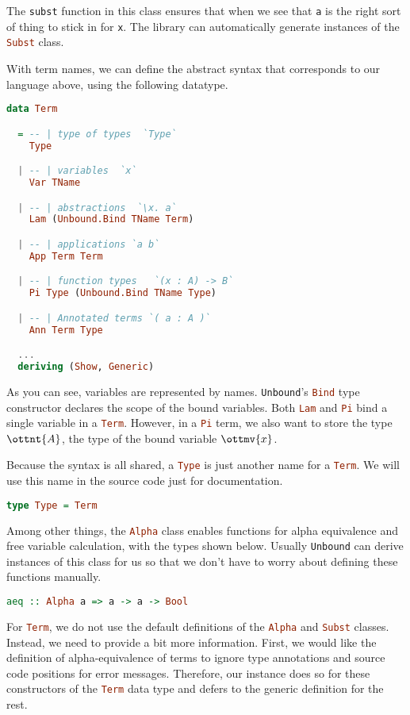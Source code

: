 \documentclass{article}
\newcommand\cd[1]{\lstinline[language=Haskell]{#1}}
\newcommand\unbound{\texttt{Unbound}\xspace}
\theoremstyle{definition}
\begin{document}
The \cd{subst} function in this class ensures that when we see that
\cd{a} is the right sort of thing to stick in for \cd{x}. The library
can automatically generate instances of the \cd{Subst} class.

With term names, we can define the abstract syntax that corresponds to our
language above, using the following datatype.

\begin{lstlisting}[language=Haskell]
data Term

  = -- | type of types  `Type`
    Type

  | -- | variables  `x`
    Var TName

  | -- | abstractions  `\x. a`
    Lam (Unbound.Bind TName Term)

  | -- | applications `a b`
    App Term Term

  | -- | function types   `(x : A) -> B`
    Pi Type (Unbound.Bind TName Type)

  | -- | Annotated terms `( a : A )`
    Ann Term Type

  ...
  deriving (Show, Generic)
\end{lstlisting}

As you can see, variables are represented by names. \unbound's \cd{Bind}
type constructor declares the scope of the bound variables. Both \cd{Lam}
and \cd{Pi} bind a single variable in a \cd{Term}.  However, in a
\cd{Pi} term, we also want to store the type $\ottnt{A}$, the type of the bound
variable $\ottmv{x}$.

Because the syntax is all shared, a \cd{Type} is just another name for a
\cd{Term}. We will use this name in the source code just for documentation.
%
\begin{lstlisting}[language=Haskell]
  type Type = Term
\end{lstlisting}
%

Among other things, the \cd{Alpha} class enables functions for alpha
equivalence and free variable calculation, with the types shown below.
Usually \unbound can derive instances of this class for us so that we don't
have to worry about defining these functions manually.

\begin{lstlisting}[language=Haskell]
aeq :: Alpha a => a -> a -> Bool
\end{lstlisting}

For \cd{Term}, we do not use the default definitions of the \cd{Alpha}
and \cd{Subst} classes. Instead, we need to provide a bit more
information.  First, we would like the definition of alpha-equivalence of
terms to ignore type annotations and source code positions for error
messages. Therefore, our instance does so for these constructors of the
\cd{Term} data type and defers to the generic definition for the rest.
\end{document}
